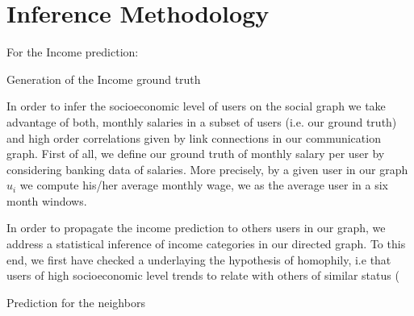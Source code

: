 \section{Inference Methodology}





For the Income prediction:

Generation of the Income ground truth

In order to infer the socioeconomic level of users on the social graph we take advantage of both, monthly salaries in a subset of users (i.e. our ground truth) and high order correlations given by link connections in our communication graph. 
First of all, we define our ground truth of monthly salary per user by considering banking data of salaries. More precisely, by a given user in our graph $u_i$ we compute his/her average monthly wage, we as the average user in a six month windows.  

In order to propagate the income prediction to others users in our graph, we address a statistical inference of income categories in our directed graph. To this end, we first have checked a underlaying the hypothesis of homophily, i.e that users of high socioeconomic level trends to relate with others of similar status (


Prediction for the neighbors

